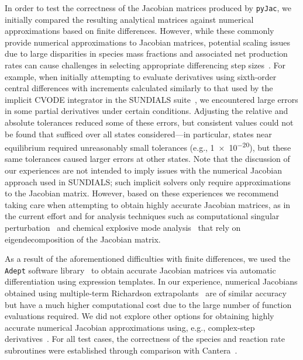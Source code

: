 \documentclass[preprint,12pt]{elsarticle}
\begin{document}
{In order to test the correctness of the Jacobian matrices produced by \texttt{pyJac}, we initially compared the resulting analytical matrices against numerical approximations based on finite differences.
However, while these commonly provide numerical approximations to Jacobian matrices, potential scaling issues due to large disparities in species mass fractions and associated net production rates can cause challenges in selecting appropriate differencing step sizes~\cite{Shampine:1994aa}.
For example, when initially attempting to evaluate derivatives using sixth-order central differences with increments calculated similarly to that used by the implicit CVODE integrator in the SUNDIALS suite~\cite{Hindmarsh:2005hg}, we encountered large errors in some partial derivatives under certain conditions.
Adjusting the relative and absolute tolerances reduced some of these errors, but consistent values could not be found that sufficed over all states considered---in particular, states near equilibrium required unreasonably small tolerances (e.g., \num{1e-20}), but these same tolerances caused larger errors at other states.
Note that the discussion of our experiences are not intended to imply issues with the numerical Jacobian approach used in SUNDIALS; such implicit solvers only require approximations to the Jacobian matrix.
However, based on these experiences we recommend taking care when attempting to obtain highly accurate Jacobian matrices, as in the current effort and for analysis techniques such as computational singular perturbation~\cite{Lam:1988wc,Lam:1993ub,Lam:1994ws,Lam:2007jq} and chemical explosive mode analysis~\cite{LU:2010hp,Luo:2012hk,Shan:2012dy} that rely on eigendecomposition of the Jacobian matrix.

As a result of the aforementioned difficulties with finite differences, we used the \texttt{Adept} software library~\cite{hogan2014fast,adept-v11} to obtain accurate Jacobian matrices via automatic differentiation using expression templates.
In our experience, numerical Jacobians obtained using multiple-term Richardson extrapolants~\cite{Richardson:1911cl,Lyness:1966aa,Lyness:1969bt} are of similar accuracy but have a much higher computational cost due to the large number of function evaluations required.
We did not explore other options for obtaining highly accurate numerical Jacobian approximations using, e.g., complex-step derivatives~\cite{Martins:2003fv,Shampine:2007gw,Ridout:2009fn}.
For all test cases, the correctness of the species and reaction rate subroutines were established through comparison with Cantera~\cite{Goodwin:2015aa}.

}
\end{document}
